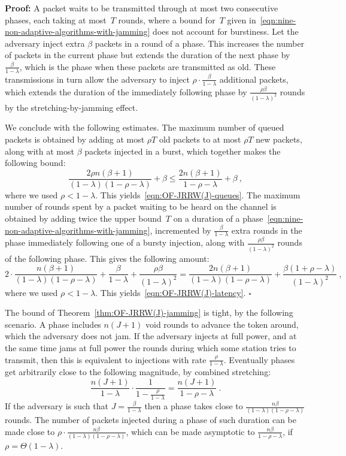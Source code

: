 \documentclass[11pt]{article}
\newcommand{\qed}{\hfill $\square$}
\newenvironment{proof}{\noindent\textbf{Proof: }}{\qed \smallbreak}
\begin{document}
\begin{proof}
A packet waits to be transmitted through at most two consecutive phases, each taking at most~$T$ rounds, where a bound for~$T$ given in~\eqref{eqn:nine-non-adaptive-algorithms-with-jamming} does not account for burstiness.
Let the adversary inject extra $\beta$ packets in a round of a phase.
This increases the number of packets in the current phase but extends the duration of the next phase by $\frac{\beta}{1-\lambda}$, which is the phase when these packets are transmitted as old.
These transmissions in turn allow the adversary to inject $\rho\cdot \frac{\beta}{1-\lambda}$ additional packets, which extends the duration of the immediately following phase by $ \frac{\rho\beta}{(1-\lambda)^2}$ rounds by the stretching-by-jamming effect.

We conclude with the following estimates.
The maximum number of queued packets is obtained by adding at most $\rho T$ old packets to at most $\rho T$ new packets, along with at most $\beta$ packets injected in a burst, which together makes the following bound:
\[
\frac{2\rho n(\beta+1)}{(1-\lambda)(1-\rho-\lambda)}+\beta \le\frac{2n(\beta+1)}{1-\rho-\lambda}+\beta
\ ,
\]
where we used $\rho< 1-\lambda$.
This yields~\eqref{eqn:OF-JRRW(J)-queues}.
The maximum number of rounds spent by a packet waiting to be heard on the channel is obtained by adding twice the upper bound~$T$ on a duration of a phase~\eqref{eqn:nine-non-adaptive-algorithms-with-jamming}, incremented by $\frac{\beta}{1-\lambda}$ extra rounds in the phase immediately following one of a bursty injection, along with $ \frac{\rho\beta}{(1-\lambda)^2}$ rounds  of the following phase.
This gives the following amount:
\[
2\cdot \frac{n(\beta+1)}{(1-\lambda)(1-\rho-\lambda)} + \frac{\beta}{1-\lambda} + \frac{\rho\beta}{(1-\lambda)^2}
=
\frac{2n(\beta+1)}{(1-\lambda)(1-\rho-\lambda)} +\frac{\beta(1+\rho-\lambda)}{(1-\lambda)^2}
\ ,
\]
where we used $\rho< 1-\lambda$.
This yields~\eqref{eqn:OF-JRRW(J)-latency}.
\end{proof}

The bound of Theorem~\ref{thm:OF-JRRW(J)-jamming}  is tight, by the following scenario.
A phase includes $n(J+1)$ void rounds to advance the token around, which the adversary does not jam.
If the adversary injects at full power, and at the same time jams  at full power the rounds during which some station tries to transmit, then this is equivalent to injections with rate $\frac{\rho}{1-\lambda}$.
Eventually phases get arbitrarily close to the following magnitude, by combined stretching:
\[
\frac{n(J+1)}{1-\lambda} \cdot \frac{1}{1-\frac{\rho}{1-\lambda}} =\frac{n(J+1)}{1-\rho-\lambda}
\ .
\]
If the adversary is such that $J=\frac{\beta}{1-\lambda}$ then a phase takes close to $\frac{n\beta}{(1-\lambda)(1-\rho-\lambda)}$ rounds.
The number of packets injected during a phase of such duration can be made close to
$\rho\cdot \frac{ n\beta}{(1-\lambda)(1-\rho-\lambda)}$, which can be made asymptotic  to $\frac{n\beta}{1-\rho-\lambda}$, if $\rho=\Theta(1-\lambda)$.
\end{document}
